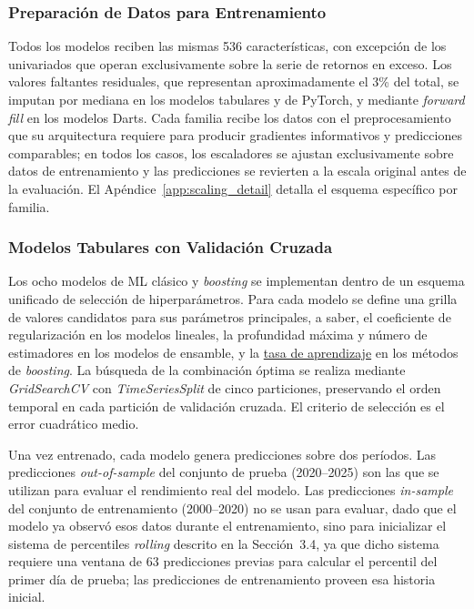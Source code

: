 ﻿\documentclass[11pt,a4paper]{article}
\begin{document}
\subsubsection{Preparaci\'on de Datos para Entrenamiento}
\label{subsec:model_preprocessing}

Todos los modelos reciben las mismas 536 caracter\'isticas, con excepci\'on de los univariados que operan exclusivamente sobre la serie de retornos en exceso. Los valores faltantes residuales, que representan aproximadamente el 3\% del total, se imputan por mediana en los modelos tabulares y de PyTorch, y mediante \textit{forward fill} en los modelos Darts. Cada familia recibe los datos con el preprocesamiento que su arquitectura requiere para producir gradientes informativos y predicciones comparables; en todos los casos, los escaladores se ajustan exclusivamente sobre datos de entrenamiento y las predicciones se revierten a la escala original antes de la evaluaci\'on. El Ap\'endice~\ref{app:scaling_detail} detalla el esquema espec\'ifico por familia.

\subsubsection{Modelos Tabulares con Validaci\'on Cruzada}

Los ocho modelos de ML cl\'asico y \textit{boosting} se implementan dentro de un esquema unificado de selecci\'on de hiperpar\'ametros. Para cada modelo se define una grilla de valores candidatos para sus par\'ametros principales, a saber, el coeficiente de regularizaci\'on en los modelos lineales, la profundidad m\'axima y n\'umero de estimadores en los modelos de ensamble, y la \hyperlink{glos:learning_rate}{tasa de aprendizaje} en los m\'etodos de \textit{boosting}. La b\'usqueda de la combinaci\'on \'optima se realiza mediante \textit{GridSearchCV} con \textit{TimeSeriesSplit} de cinco particiones, preservando el orden temporal en cada partici\'on de validaci\'on cruzada. El criterio de selecci\'on es el error cuadr\'atico medio.

Una vez entrenado, cada modelo genera predicciones sobre dos per\'iodos. Las predicciones \textit{out-of-sample} del conjunto de prueba (2020--2025) son las que se utilizan para evaluar el rendimiento real del modelo. Las predicciones \textit{in-sample} del conjunto de entrenamiento (2000--2020) no se usan para evaluar, dado que el modelo ya observ\'o esos datos durante el entrenamiento, sino para inicializar el sistema de percentiles \textit{rolling} descrito en la Secci\'on~3.4, ya que dicho sistema requiere una ventana de 63 predicciones previas para calcular el percentil del primer d\'ia de prueba; las predicciones de entrenamiento proveen esa historia inicial.
\end{document}
